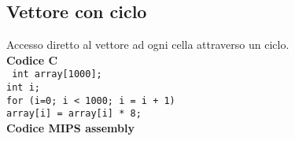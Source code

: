 \documentclass[../main.tex]{subfiles}
\begin{document}
\subsection{Vettore con ciclo}
Accesso diretto al vettore ad ogni cella attraverso un ciclo.
\\[5mm]
\textbf{Codice C} \\
\texttt{
    int array[1000]; \\
    int i; \\
    for (i=0; i < 1000; i = i + 1) \\
    \hspace*{0cm} \hspace*{0cm} \hspace*{0cm} \hspace*{0cm} array[i] = array[i] * 8; \\[3mm]
}
\textbf{Codice MIPS assembly} \\
\end{document}
